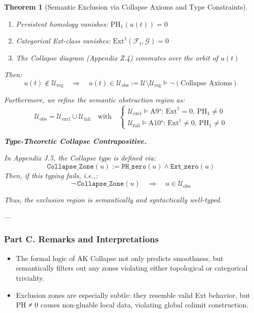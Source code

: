 \documentclass[11pt]{article}
\newtheorem{theorem}{Theorem}[section]
\begin{document}
\begin{axiom}
\begin{axiom}
{{\begin{theorem}[Semantic Exclusion via Collapse Axioms and Type Constraints]
\begin{enumerate}
  \item Persistent homology vanishes: \( \mathrm{PH}_1(u(t)) = 0 \)
  \item Categorical Ext-class vanishes: \( \mathrm{Ext}^1(\mathcal{F}_t, \mathcal{G}) = 0 \)
  \item The Collapse diagram (Appendix Z.4) commutes over the orbit of \( u(t) \)
\end{enumerate}

Then:
\[
u(t) \notin \mathcal{U}_{\mathrm{reg}} \quad \Rightarrow \quad u(t) \in \mathcal{U}_{\mathrm{obs}} := \mathcal{U} \setminus \mathcal{U}_{\mathrm{reg}} \models \neg(\text{Collapse Axioms})
\]

Furthermore, we refine the semantic obstruction region as:
\[
\mathcal{U}_{\mathrm{obs}} = \mathcal{U}_{\mathrm{excl}} \cup \mathcal{U}_{\mathrm{fail}}
\quad \text{with} \quad
\begin{cases}
\mathcal{U}_{\mathrm{excl}} \models \text{A9⁺: } \mathrm{Ext}^1 = 0,\, \mathrm{PH}_1 \neq 0 \\
\mathcal{U}_{\mathrm{fail}} \models \text{A10⁺: } \mathrm{Ext}^1 \neq 0,\, \mathrm{PH}_1 \neq 0
\end{cases}
\]

\textbf{Type-Theoretic Collapse Contrapositive.}

In Appendix J.5, the Collapse type is defined via:
\[
\texttt{Collapse\_Zone}(u) := \texttt{PH\_zero}(u) \land \texttt{Ext\_zero}(u)
\]
Then, if this typing fails, i.e.,:
\[
\neg\, \texttt{Collapse\_Zone}(u) \quad \Rightarrow \quad u \in \mathcal{U}_{\mathrm{obs}}
\]

Thus, the exclusion region is semantically and syntactically well-typed.

\end{theorem}

---

\subsubsection*{Part C. Remarks and Interpretations}

\begin{itemize}
  \item The formal logic of AK Collapse not only predicts smoothness,  
  but semantically filters out any zones violating either topological or categorical triviality.

  \item Exclusion zones are especially subtle: they resemble valid Ext behavior,  
  but PH ≠ 0 causes non-gluable local data, violating global colimit construction.


\end{itemize}}}
\end{axiom}
\end{axiom}
\end{document}
